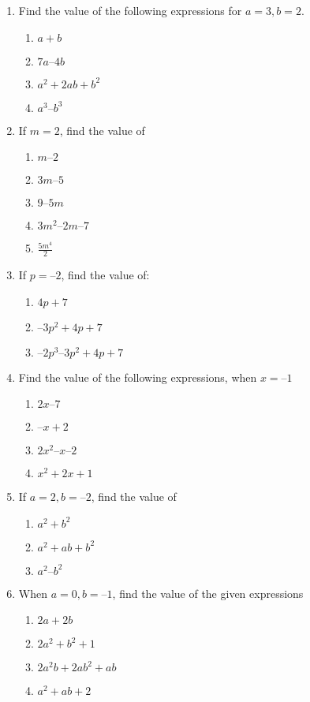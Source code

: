 \begin{enumerate}[label=\thesection.\arabic*, ref=\thesection.\theenumi]
\begin{enumerate}
	\end{enumerate}
\item Find the value of the following expressions for $a = 3, b = 2$. 
	\begin{enumerate}
\item $a + b$				
\item $ 7a – 4b $
\item $ a^2+2ab+b^2$
\item $ a^3 – b^3$
\end{enumerate}
\item If $m = 2$, find the value of
	\begin{enumerate}
\item $ m – 2$
\item $ 3m – 5 $
\item $ 9 – 5m $
\item $ 3m^2 – 2m – 7 $
\item $ \frac{5m^4}{ 2}$
\end{enumerate}
\item  If $p = – 2$, find the value of: 
	\begin{enumerate}
\item $4p + 7$
\item  $– 3p^2 + 4p + 7 $
\item  $– 2p^3 – 3p^2 + 4p + 7$
\end{enumerate}
\item  Find the value of the following expressions, when $x = –1$ 
	\begin{enumerate}
\item $ 2x – 7$
\item $ – x + 2$ 
\item $ 2x^2 – x – 2$
\item $ x^2 + 2x +1$
\end{enumerate}
\item  If $a = 2, b = – 2$, find the value of
	\begin{enumerate}
\item  $ a^2 + b^2$
\item  $a^2 + ab + b^2 $
\item  $a^2 – b^2$
\end{enumerate}
\item  When $a = 0, b = – 1$, find the value of the given expressions
	\begin{enumerate}
\item $2a + 2b$
\item $2a^2 + b^2 + 1 $
\item $2a^2b + 2ab^2 + ab $
\item $a^2 + ab + 2$

\end{enumerate}
\end{enumerate}
